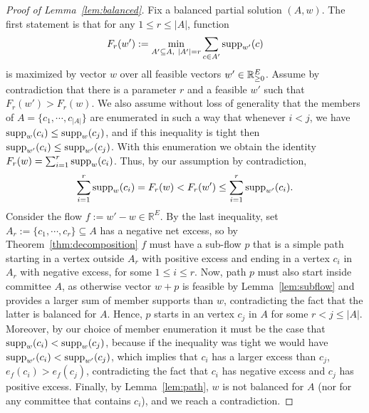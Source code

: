 \begin{proof}[Proof of Lemma~\ref{lem:balanced}]
Fix a balanced partial solution $(A,w)$. The first statement is that for any $1\leq r\leq |A|$, function 
%
$$F_r(w'):=\min_{A'\subseteq A, \ |A'|=r} \sum_{c\in A'} \supp_{w'}(c)$$
% 
is maximized by vector $w$ over all feasible vectors $w'\in\mathbb{R}_{\geq 0}^E$. 
Assume by contradiction that there is a parameter $r$ and a feasible $w'$ such that $F_r(w')>F_r(w)$. 
We also assume without loss of generality that the members of $A=\{c_1, \cdots, c_{|A|}\}$ are enumerated in such a way that whenever $i<j$, we have $\operatorname{supp}_w(c_i)\leq \operatorname{supp}_w(c_j)$, and if this inequality is tight then $\operatorname{supp}_{w'}(c_i)\leq \operatorname{supp}_{w'}(c_j)$.
%
With this enumeration we obtain the identity $F_r(w)=\sum_{i=1}^r \operatorname{supp}_w(c_i)$. 
Thus, by our assumption by contradiction, 
$$ \sum_{i=1}^r \operatorname{supp}_{w}(c_i) = F_r(w) < F_r(w') \leq  \sum_{i=1}^r \operatorname{supp}_{w'}(c_i). $$
%
%
Consider the flow $f:=w'-w\in\mathbb{R}^E$. 
By the last inequality, set $A_r:=\{c_1, \cdots, c_r\}\subseteq A$ has a negative net excess, so by Theorem~\ref{thm:decomposition} $f$ must have a sub-flow $p$ that is a simple path starting in a vertex outside $A_r$ with positive excess and ending in a vertex $c_i$ in $A_r$ with negative excess, for some $1\leq i\leq r$. 
Now, path $p$ must also start inside committee $A$, as otherwise vector $w+p$ is feasible by Lemma~\ref{lem:subflow} and provides a larger sum of member supports than $w$, contradicting the fact that the latter is balanced for $A$. 
Hence, $p$ starts in an vertex $c_j$ in $A$ for some $r<j\leq |A|$. 
Moreover, by our choice of member enumeration it must be the case that $\operatorname{supp}_w(c_i)<\operatorname{supp}_w(c_j)$, because if the inequality was tight we would have $\operatorname{supp}_{w'}(c_i)<\operatorname{supp}_{w'}(c_j)$, which implies that $c_i$ has a larger excess than $c_j$, $e_f(c_i)> e_f(c_j)$, contradicting the fact that $c_i$ has negative excess and $c_j$ has positive excess.
Finally, by Lemma~\ref{lem:path}, $w$ is not balanced for $A$ (nor for any committee that contains $c_i$), and we reach a contradiction. 


\end{proof}
